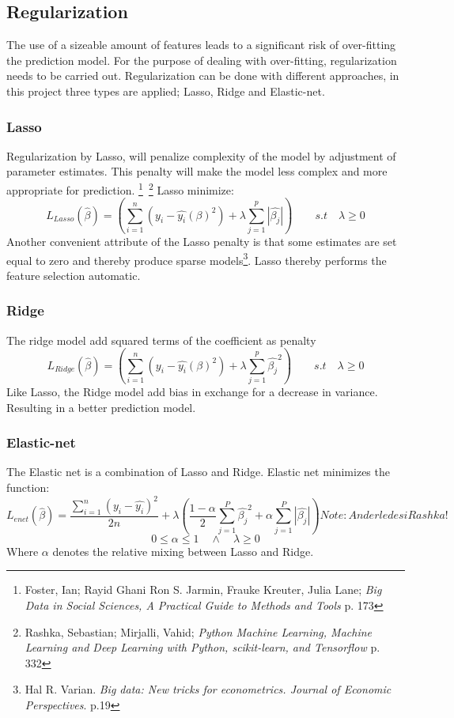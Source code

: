 \documentclass[12pt,a4paper]{article}
\begin{document}
\subsection{Regularization}
The use of a sizeable amount of features leads to a significant risk of over-fitting the prediction model. 
For the purpose of dealing with over-fitting, regularization needs to be carried out. Regularization can be done with different approaches, in this project three types are applied; Lasso, Ridge and Elastic-net.   
\subsubsection{Lasso}
Regularization by Lasso, will penalize complexity of the model by adjustment of parameter estimates. This penalty will make the model less complex and more appropriate for prediction.  \footnote{Foster, Ian; Rayid Ghani Ron S. Jarmin, Frauke Kreuter, Julia Lane; \textit{Big Data in Social Sciences, A Practical Guide to Methods and Tools} p. 173}\, \footnote{Rashka, Sebastian; Mirjalli, Vahid; \textit{Python Machine Learning, Machine Learning and Deep Learning with Python, scikit-learn, and Tensorflow} p. 332}
\newline Lasso minimize: $$L_{Lasso}(\hat{\beta}) = \left(\sum_{i=1}^{n} (y_i-\hat{y_i}(\beta)^2)+\lambda\sum_{j=1}^{p}|\hat{\beta_j}|\right) \qquad s.t \quad \lambda \geq 0 $$
Another convenient attribute of the Lasso penalty is that some estimates are set equal to zero and thereby produce sparse models\footnote{Hal R. Varian. \textit{Big data: New tricks for econometrics. Journal of Economic Perspectives}. p.19}. Lasso thereby performs the feature selection automatic.   
\subsubsection{Ridge}
The ridge model add squared terms of the coefficient as penalty
$$L_{Ridge}(\hat{\beta}) = \left(\sum_{i=1}^{n} (y_i-\hat{y_i}(\beta)^2)+\lambda\sum_{j=1}^{p}\hat{\beta_j}^2\right) \qquad s.t \quad \lambda \geq 0 $$ 
Like Lasso, the Ridge model add bias in exchange for a decrease in variance. Resulting in a better prediction model. 

\subsubsection{Elastic-net}
The Elastic net is a combination of Lasso and Ridge. Elastic net minimizes the function: 
$$L_{enet}(\hat{\beta}) = \frac{\sum_{i=1}^{n}\left(y_i-\hat{y_i}\right)^2}{2n} + \lambda\left(\frac{1-\alpha}{2}\sum_{j=1}^{P}\hat{\beta_j}^2+\alpha\sum_{j=1}^{P}|\hat{\beta_j}|\right) Note: Anderledes i Rashka!$$
$$0 \leq \alpha \leq 1 \quad \wedge \quad \lambda \geq 0$$
Where $\alpha$ denotes the relative mixing between Lasso and Ridge. 
\end{document}
